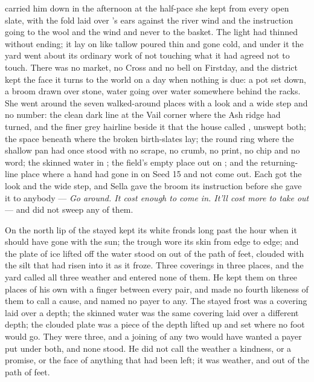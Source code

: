  carried him down in the afternoon at the half-pace she kept from every open slate, with the fold laid over 's ears against the river wind and the instruction going to the wool and the wind and never to the basket. The light had thinned without ending; it lay on  like tallow poured thin and gone cold, and under it the yard went about its ordinary work of not touching what it had agreed not to touch. There was no market, no Cross and no bell on Firstday, and the district kept the face it turns to the world on a day when nothing is due: a pot set down, a broom drawn over stone, water going over water somewhere behind the racks. She went around the seven walked-around places with a look and a wide step and no number: the clean dark line at the Vail corner where the Ash ridge had turned, and the finer grey hairline beside it that the house called , unswept both; the space beneath  where the broken birth-slates lay; the round ring where the shallow pan had once stood with no scrape, no crumb, no print, no chip and no word; the skinned water in ; the field's empty place out on ; and the returning-line place where a hand had gone in on Seed 15 and not come out. Each got the look and the wide step, and Sella gave the broom its instruction before she gave it to anybody --- \emph{Go around. It cost enough to come in. It'll cost more to take out} --- and did not sweep any of them.

On the north lip of  the stayed  kept its white fronds long past the hour when it should have gone with the sun; the trough wore its skin from edge to edge; and the plate of ice lifted off the water stood on  out of the path of feet, clouded with the silt that had risen into it as it froze. Three coverings in three places, and the yard called all three weather and entered none of them. He kept them on three places of his own with a finger between every pair, and made no fourth likeness of them to call a cause, and named no payer to any. The stayed frost was a covering laid over a depth; the skinned water was the same covering laid over a different depth; the clouded plate was a piece of the depth lifted up and set where no foot would go. They were three, and a joining of any two would have wanted a payer put under both, and none stood. He did not call the weather a kindness, or a promise, or the face of anything that had been left; it was weather, and out of the path of feet.

